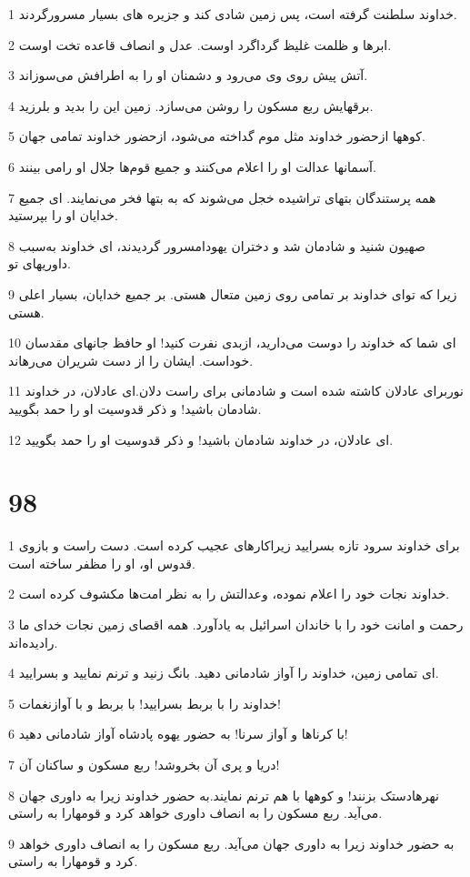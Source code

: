 \par 1 خداوند سلطنت گرفته است، پس زمین شادی کند و جزیره های بسیار مسرورگردند.
\par 2 ابرها و ظلمت غلیظ گرداگرد اوست. عدل و انصاف قاعده تخت اوست.
\par 3 آتش پیش روی وی می‌رود و دشمنان او را به اطرافش می‌سوزاند.
\par 4 برقهایش ربع مسکون را روشن می‌سازد. زمین این را بدید و بلرزید.
\par 5 کوهها ازحضور خداوند مثل موم گداخته می‌شود، ازحضور خداوند تمامی جهان.
\par 6 آسمانها عدالت او را اعلام می‌کنند و جمیع قوم‌ها جلال او رامی بینند.
\par 7 همه پرستندگان بتهای تراشیده خجل می‌شوند که به بتها فخر می‌نمایند. ای جمیع خدایان او را بپرستید.
\par 8 صهیون شنید و شادمان شد و دختران یهودامسرور گردیدند، ای خداوند به‌سبب داوریهای تو.
\par 9 زیرا که تو‌ای خداوند بر تمامی روی زمین متعال هستی. بر جمیع خدایان، بسیار اعلی هستی.
\par 10 ‌ای شما که خداوند را دوست می‌دارید، ازبدی نفرت کنید! او حافظ جانهای مقدسان خوداست. ایشان را از دست شریران می‌رهاند.
\par 11 نوربرای عادلان کاشته شده است و شادمانی برای راست دلان.‌ای عادلان، در خداوند شادمان باشید! و ذکر قدوسیت او را حمد بگویید.
\par 12 ‌ای عادلان، در خداوند شادمان باشید! و ذکر قدوسیت او را حمد بگویید.
 
\chapter{98}

\par 1 برای خداوند سرود تازه بسرایید زیراکارهای عجیب کرده است. دست راست و بازوی قدوس او، او را مظفر ساخته است.
\par 2 خداوند نجات خود را اعلام نموده، وعدالتش را به نظر امت‌ها مکشوف کرده است.
\par 3 رحمت و امانت خود را با خاندان اسرائیل به یادآورد. همه اقصای زمین نجات خدای ما رادیده‌اند.
\par 4 ‌ای تمامی زمین، خداوند را آواز شادمانی دهید. بانگ زنید و ترنم نمایید و بسرایید.
\par 5 خداوند را با بربط بسرایید! با بربط و با آوازنغمات!
\par 6 با کرناها و آواز سرنا! به حضور یهوه پادشاه آواز شادمانی دهید!
\par 7 دریا و پری آن بخروشد! ربع مسکون و ساکنان آن!
\par 8 نهرهادستک بزنند! و کوهها با هم ترنم نمایند.به حضور خداوند زیرا به داوری جهان می‌آید. ربع مسکون را به انصاف داوری خواهد کرد و قومهارا به راستی.
\par 9 به حضور خداوند زیرا به داوری جهان می‌آید. ربع مسکون را به انصاف داوری خواهد کرد و قومهارا به راستی.
 
